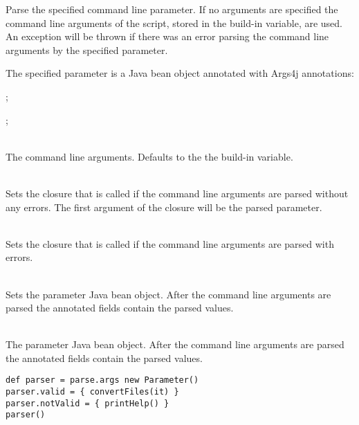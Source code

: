 %


Parse the specified command line parameter. If no 
arguments are specified the command line arguments of the script, stored in
the  build-in variable, are used.
An exception will be thrown if there was an error parsing the command line arguments
by the specified parameter.

The specified parameter is a Java bean object annotated with 
Args4j\cite{args4j13} annotations:
\begin{inparaitem}
\item {};
\item {};
\end{inparaitem}

\begin{asparadesc}
%
\item[\code{arguments: array|list}] \hfill \\
The command line arguments. Defaults to the the  build-in variable.
%
\item[\code{valid: closure}] \hfill \\
Sets the closure that is called if the command line arguments are parsed without
any errors. The first argument of the closure will be the parsed parameter.
%
\item[\code{notValid: closure}] \hfill \\
Sets the closure that is called if the command line arguments are parsed with
errors.
%
\item[\code{parameter}] \hfill \\
Sets the parameter Java bean object. After the command line arguments are parsed
the annotated fields contain the parsed values.
%
\item[\code{theParameter}] \hfill \\
The parameter Java bean object. After the command line arguments are parsed
the annotated fields contain the parsed values.
%
\end{asparadesc}

\begin{lstlisting}[style=Groovybash, label={lst:example_arguments_parse}, title={%
\Command{parse} command: storing the parse command in a variable and set 
the arguments and parse the command line arguments at a later point.}]
def parser = parse.args new Parameter()
parser.valid = { convertFiles(it) }
parser.notValid = { printHelp() }
parser()
\end{lstlisting}

